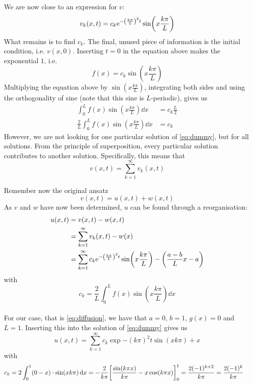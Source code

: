 We are now close to an expression for \(v\):
\[
    v_k(x,t) = c_k\mathrm{e}^{-\qty(\frac{k \pi}{L})^2t}\sin(x\frac{k \pi}{L})
\]
What remains is to find \(c_k\). The final, unused piece of information is the initial condition, i.e. \(v(x,0)\). Inserting \(t=0\) in the equation above makes the exponential \(1\), i.e.
\[
    f(x) = c_k\sin(x\frac{k \pi}{L})
\]
Multiplying  the equation above by \(\sin(x\frac{k \pi}{L})\), integrating both sides and using the orthogonality of sine (note that this sine is \(L\)-periodic), gives us
\begin{align*}
    \int_0^Lf(x)\sin(x\frac{k \pi}{L})\dd{x} &= c_k\frac{L}{2} \\
    \frac{2}{L}\int_0^Lf(x)\sin(x\frac{k \pi}{L})\dd{x} &= c_k
\end{align*}
However, we are not looking for one particular solution of \ref{eq:dummy}, but for all solutions. From the principle of superposition, every particular solution contributes to another solution. Specifically, this means that
\[
    v(x,t) = \sum_{k=1}^\infty v_k(x,t)
\]

Remember now the original ansatz
\[
    v(x,t) = u(x,t) + w(x,t)
\]
As \(v\) and \(w\) have now been determined, \(u\) can be found through a reorganisation:
\begin{align*}
    u(x,t) &= v(x,t)- w(x,t) \\
    &=  \sum_{k=1}^\infty v_k(x,t) - w(x) \\
    &=\sum_{k=1}^\infty c_k\mathrm{e}^{-\qty(\frac{k \pi}{L})^2t}\sin(x\frac{k \pi}{L})  -\qty(\frac{a-b}{L}x - a)
\end{align*}
with
\[
    c_k = \frac{2}{L}\int_0^Lf(x)\sin(x\frac{k \pi}{L})\dd{x}
\]
\hfill \\
For our case, that is \vref{eq:diffusion}, we have that \(a = 0\), \(b = 1\), \(g(x) = 0\) and \(L = 1\). Inserting this into the solution of \vref{eq:dummy} gives us
\begin{equation}\label{eq:analyticalSolution}
	u(x,t) = \sum_{k=1}^\infty c_k\exp{-(k\pi)^2t}\sin(xk\pi)  + x
\end{equation}
with
\begin{align*}
    c_k &= 2\int_0^1(0-x)\cdot\sin(xk\pi)\dd{x}
    = - \frac{2}{k\pi}\qty[\frac{\sin(k\pi x)}{k\pi} - x\cos(k\pi x)]_0^1
    = \frac{2(-1)^{k+2}}{k\pi}
    =  \frac{2(-1)^k}{k\pi}
\end{align*}
